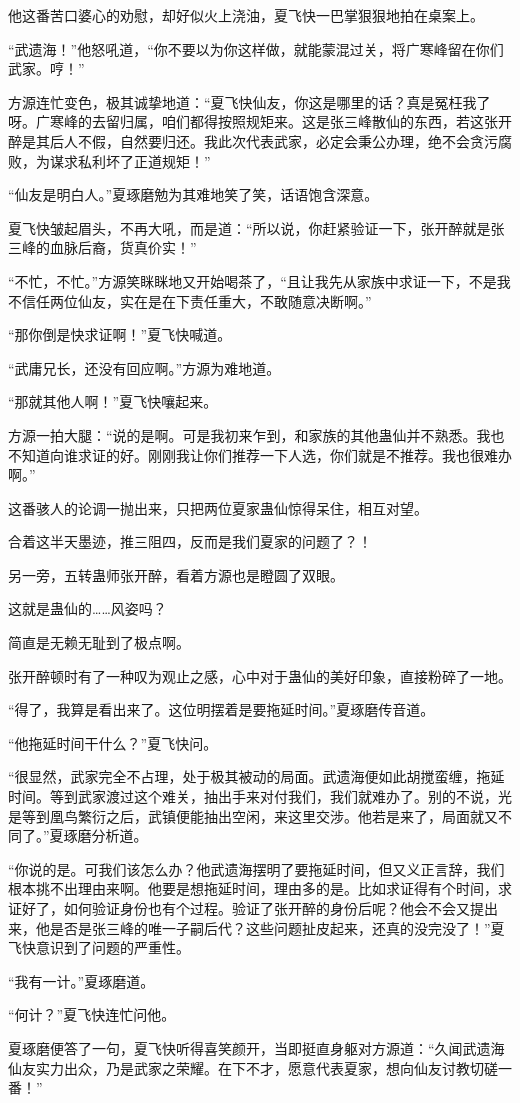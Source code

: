 \begin{this_body}
他这番苦口婆心的劝慰，却好似火上浇油，夏飞快一巴掌狠狠地拍在桌案上。

“武遗海！”他怒吼道，“你不要以为你这样做，就能蒙混过关，将广寒峰留在你们武家。哼！”

方源连忙变色，极其诚挚地道：“夏飞快仙友，你这是哪里的话？真是冤枉我了呀。广寒峰的去留归属，咱们都得按照规矩来。这是张三峰散仙的东西，若这张开醉是其后人不假，自然要归还。我此次代表武家，必定会秉公办理，绝不会贪污腐败，为谋求私利坏了正道规矩！”

“仙友是明白人。”夏琢磨勉为其难地笑了笑，话语饱含深意。

夏飞快皱起眉头，不再大吼，而是道：“所以说，你赶紧验证一下，张开醉就是张三峰的血脉后裔，货真价实！”

“不忙，不忙。”方源笑眯眯地又开始喝茶了，“且让我先从家族中求证一下，不是我不信任两位仙友，实在是在下责任重大，不敢随意决断啊。”

“那你倒是快求证啊！”夏飞快喊道。

“武庸兄长，还没有回应啊。”方源为难地道。

“那就其他人啊！”夏飞快嚷起来。

方源一拍大腿：“说的是啊。可是我初来乍到，和家族的其他蛊仙并不熟悉。我也不知道向谁求证的好。刚刚我让你们推荐一下人选，你们就是不推荐。我也很难办啊。”

这番骇人的论调一抛出来，只把两位夏家蛊仙惊得呆住，相互对望。

合着这半天墨迹，推三阻四，反而是我们夏家的问题了？！

另一旁，五转蛊师张开醉，看着方源也是瞪圆了双眼。

这就是蛊仙的……风姿吗？

简直是无赖无耻到了极点啊。

张开醉顿时有了一种叹为观止之感，心中对于蛊仙的美好印象，直接粉碎了一地。

“得了，我算是看出来了。这位明摆着是要拖延时间。”夏琢磨传音道。

“他拖延时间干什么？”夏飞快问。

“很显然，武家完全不占理，处于极其被动的局面。武遗海便如此胡搅蛮缠，拖延时间。等到武家渡过这个难关，抽出手来对付我们，我们就难办了。别的不说，光是等到凰鸟繁衍之后，武镇便能抽出空闲，来这里交涉。他若是来了，局面就又不同了。”夏琢磨分析道。

“你说的是。可我们该怎么办？他武遗海摆明了要拖延时间，但又义正言辞，我们根本挑不出理由来啊。他要是想拖延时间，理由多的是。比如求证得有个时间，求证好了，如何验证身份也有个过程。验证了张开醉的身份后呢？他会不会又提出来，他是否是张三峰的唯一子嗣后代？这些问题扯皮起来，还真的没完没了！”夏飞快意识到了问题的严重性。

“我有一计。”夏琢磨道。

“何计？”夏飞快连忙问他。

夏琢磨便答了一句，夏飞快听得喜笑颜开，当即挺直身躯对方源道：“久闻武遗海仙友实力出众，乃是武家之荣耀。在下不才，愿意代表夏家，想向仙友讨教切磋一番！”

\end{this_body}


